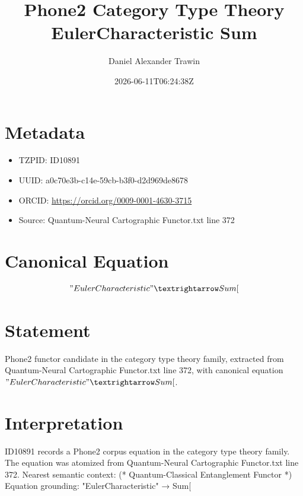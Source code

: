 \documentclass[11pt]{article}
\title{Phone2 Category Type Theory EulerCharacteristic Sum}
\author{Daniel Alexander Trawin}
\date{2026-06-11T06:24:38Z}
\begin{document}
\maketitle
\section*{Metadata}
\begin{itemize}
\item TZPID: ID10891
\item UUID: a0c70e3b-c14e-59cb-b3f0-d2d969de8678
\item ORCID: \url{https://orcid.org/0009-0001-4630-3715}
\item Source: Quantum-Neural Cartographic Functor.txt line 372
\end{itemize}
\section*{Canonical Equation}
\[
"EulerCharacteristic" → Sum[
\]
\section*{Statement}
Phone2 functor candidate in the category type theory family, extracted from Quantum-Neural Cartographic Functor.txt line 372, with canonical equation $"EulerCharacteristic" → Sum[$.
\section*{Interpretation}
ID10891 records a Phone2 corpus equation in the category type theory family. The equation was atomized from Quantum-Neural Cartographic Functor.txt line 372. Nearest semantic context: (* Quantum-Classical Entanglement Functor *) Equation grounding: "EulerCharacteristic" → Sum[
\end{document}
